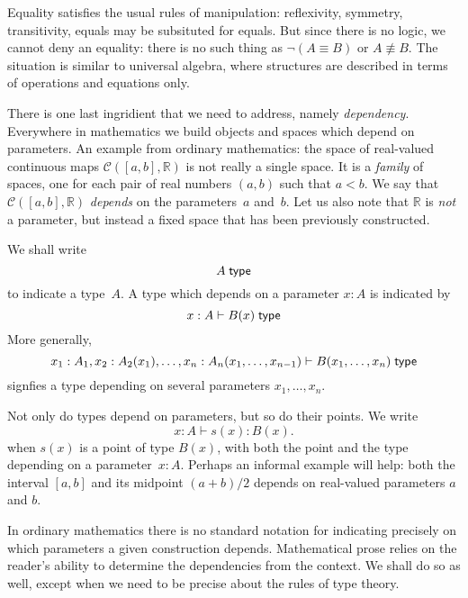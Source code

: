 \documentclass{article}
\begin{document}
Equality satisfies the usual rules of manipulation: reflexivity, symmetry,
transitivity, equals may be subsituted for equals. But since there is no logic,
we cannot deny an equality: there is no such thing as $\lnot (A \equiv B)$ or
$A \not\equiv B$. The situation is similar to universal algebra, where
structures are described in terms of operations and equations only.

There is one last ingridient that we need to address, namely \emph{dependency}.
Everywhere in mathematics we build objects and spaces which depend on
parameters. An example from ordinary mathematics: the space of real-valued
continuous maps $\mathcal{C}([a,b], \mathbb{R})$ is not really a single space. It
is a \emph{family} of spaces, one for each pair of real numbers $(a,b)$ such
that $a < b$. We say that $\mathcal{C}([a,b], \mathbb{R})$ \emph{depends} on the
parameters~$a$ and~$b$. Let us also note that $\mathbb{R}$ is \emph{not} a
parameter, but instead a fixed space that has been previously constructed.

We shall write
%
\begin{equation*}
  A\; \mathsf{type}
\end{equation*}
%
to indicate a type~$A$. A type which depends on a parameter $x : A$ is indicated by
%
\begin{equation*}
  x : A \vdash B(x)\; \mathsf{type}
\end{equation*}
%
More generally,
%
\begin{equation*}
  x_1 : A_1, x_2 : A_2(x_1), \ldots, x_n : A_n(x_1, \ldots, x_{n-1}) \vdash
  B(x_1, \ldots, x_n)\; \mathsf{type}
\end{equation*}
%
signfies a type depending on several parameters $x_1, \ldots, x_n$.

Not only do types depend on parameters, but so do their points. We write
%
\begin{equation*}
  x : A \vdash s(x) : B(x).
\end{equation*}
%
when $s(x)$ is a point of type $B(x)$, with both the point and the type
depending on a parameter~$x : A$. Perhaps an informal example will help: both
the interval $[a,b]$ and its midpoint $(a + b)/2$ depends on real-valued
parameters $a$ and $b$.

In ordinary mathematics there is no standard notation for indicating precisely
on which parameters a given construction depends. Mathematical prose relies on
the reader's ability to determine the dependencies from the context. We shall do
so as well, except when we need to be precise about the rules of type theory.
\end{document}
